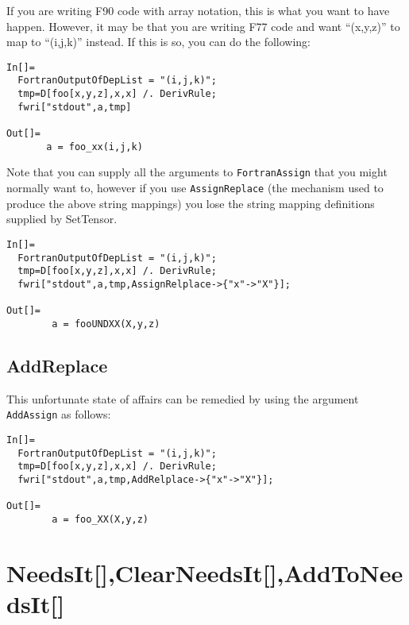 If you are writing F90 code with array notation, this is what you want
to have happen.  However, it may be that you are writing F77 code and
want ``(x,y,z)'' to map to ``(i,j,k)'' instead.  If this is so, you
can do the following:
\begin{verbatim}
In[]=
  FortranOutputOfDepList = "(i,j,k)";
  tmp=D[foo[x,y,z],x,x] /. DerivRule;
  fwri["stdout",a,tmp]

Out[]=
       a = foo_xx(i,j,k)
\end{verbatim}

Note that you can supply all the arguments to {\tt FortranAssign} that
you might normally want to, however if you use {\tt AssignReplace}
(the mechanism used to produce the above string mappings) you lose the
string mapping definitions supplied by SetTensor.
\begin{verbatim}
In[]=
  FortranOutputOfDepList = "(i,j,k)";
  tmp=D[foo[x,y,z],x,x] /. DerivRule;
  fwri["stdout",a,tmp,AssignRelplace->{"x"->"X"}];

Out[]=
        a = fooUNDXX(X,y,z)
\end{verbatim}
\subsection{AddReplace}
This unfortunate state of affairs can be remedied by using the 
argument {\tt AddAssign} as follows:
\begin{verbatim}
In[]=
  FortranOutputOfDepList = "(i,j,k)";
  tmp=D[foo[x,y,z],x,x] /. DerivRule;
  fwri["stdout",a,tmp,AddRelplace->{"x"->"X"}];

Out[]=
        a = foo_XX(X,y,z)
\end{verbatim}

\section{NeedsIt[],ClearNeedsIt[],AddToNeedsIt[]}

